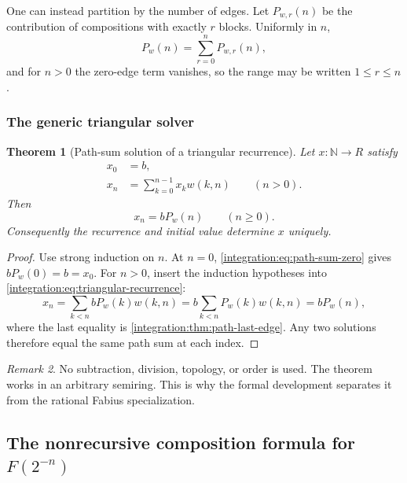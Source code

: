 \documentclass[11pt,oneside]{article}
\newtheorem{theorem}{Theorem}[section]
\theoremstyle{definition}
\theoremstyle{remark}
\newtheorem{remark}[theorem]{Remark}
\newcommand{\N}{\mathbb N}
\begin{document}
One can instead partition by the number of edges.  Let $P_{w,r}(n)$ be the contribution of
compositions with exactly $r$ blocks.  Uniformly in $n$,
\begin{equation}
 P_w(n)=\sum_{r=0}^{n}P_{w,r}(n),
 \label{integration:eq:path-length-uniform}
\end{equation}
and for $n>0$ the zero-edge term vanishes, so the range may be written $1\le r\le n$.

\subsubsection{The generic triangular solver}

\begin{theorem}[Path-sum solution of a triangular recurrence]
\label{integration:thm:triangular-path-solver}
Let $x:\N\to R$ satisfy
\begin{align}
 x_0&=b,                                                    \label{integration:eq:triangular-initial}\\
 x_n&=\sum_{k=0}^{n-1}x_k w(k,n)\qquad(n>0).               \label{integration:eq:triangular-recurrence}
\end{align}
Then
\begin{equation}
 x_n=bP_w(n)
 \qquad(n\ge0).
 \label{integration:eq:triangular-path-solution}
\end{equation}
Consequently the recurrence and initial value determine $x$ uniquely.
\end{theorem}

\begin{proof}
Use strong induction on $n$.  At $n=0$, \eqref{integration:eq:path-sum-zero} gives
$bP_w(0)=b=x_0$.  For $n>0$, insert the induction hypotheses into
\eqref{integration:eq:triangular-recurrence}:
\[
 x_n=\sum_{k<n}bP_w(k)w(k,n)
 =b\sum_{k<n}P_w(k)w(k,n)
 =bP_w(n),
\]
where the last equality is \cref{integration:thm:path-last-edge}.  Any two solutions therefore equal the
same path sum at each index.
\end{proof}

\begin{remark}
No subtraction, division, topology, or order is used.  The theorem works in an arbitrary
semiring.  This is why the formal development separates it from the rational Fabius
specialization.
\end{remark}

\subsection{The nonrecursive composition formula for \texorpdfstring{$F(2^{-n})$}{F(2 to the -n)}}
\label{integration:sec:fabius-composition-formula}
\end{document}
